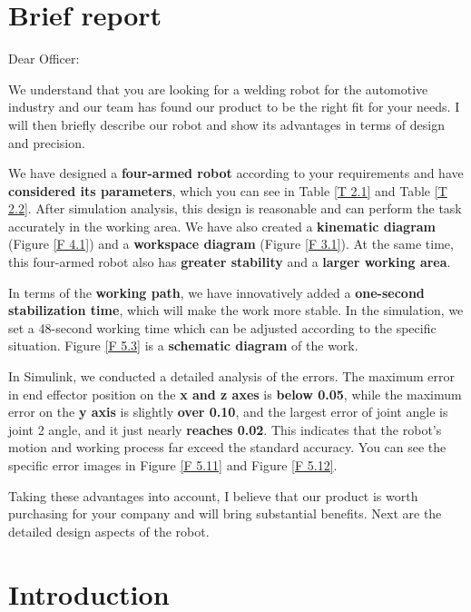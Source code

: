 \section{Brief report}

	\noindent Dear Officer:
	
	\noindent We understand that you are looking for a welding robot for the automotive industry and our team has found our product to be the right fit for your needs. I will then briefly describe our robot and show its advantages in terms of design and precision.
	
	\noindent We have designed a \textbf{four-armed robot} according to your requirements and have \textbf{considered its parameters}, which you can see in Table \ref*{T 2.1} and Table \ref*{T 2.2}. After simulation analysis, this design is reasonable and can perform the task accurately in the working area. We have also created a \textbf{kinematic diagram} (Figure \ref{F 4.1}) and a \textbf{workspace diagram} (Figure \ref{F 3.1}). At the same time, this four-armed robot also has \textbf{greater stability} and a \textbf{larger working area}.
	
	\noindent In terms of the \textbf{working path}, we have innovatively added a \textbf{one-second stabilization time}, which will make the work more stable. In the simulation, we set a 48-second working time which can be adjusted according to the specific situation. Figure \ref{F 5.3}  is a \textbf{schematic diagram} of the work.
	
	\noindent In Simulink, we conducted a detailed analysis of the errors. The maximum error in end effector position on the \textbf{x and z axes} is \textbf{below 0.05}, while the maximum error on the \textbf{y axis} is slightly \textbf{over 0.10}, and the largest error of joint angle is joint 2 angle, and it just nearly \textbf{reaches 0.02}. This indicates that the robot's motion and working process far exceed the standard accuracy. You can see the specific error images in Figure \ref{F 5.11} and Figure \ref{F 5.12}.
	
	\noindent Taking these advantages into account, I believe that our product is worth purchasing for your company and will bring substantial benefits. Next are the detailed design aspects of the robot.

\section{Introduction}
\FloatBarrier %

